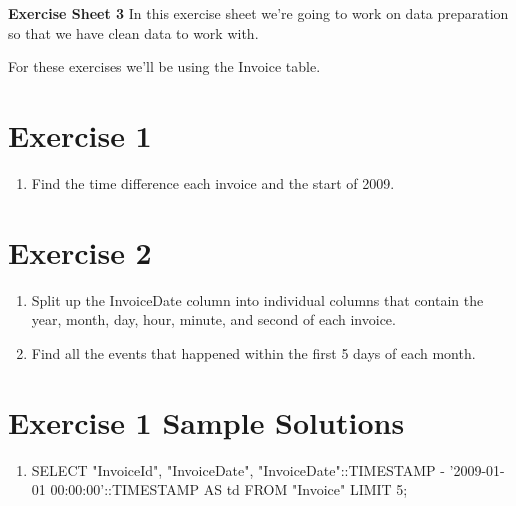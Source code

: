 \documentclass[USenglish,final,authoryear,12pt]{article}
\begin{document}
\textbf{\LARGE Exercise Sheet 3}\newline
In this exercise sheet we're going to work on data preparation so that we have clean data to work with.\newline

For these exercises we'll be using the Invoice table.
\section{Exercise 1}

\begin{enumerate}
	\item Find the time difference each invoice and the start of 2009.
\end{enumerate}

\section{Exercise 2}

\begin{enumerate}
	\item Split up the InvoiceDate column into individual columns that contain the year, month, day, hour, minute, and second of each invoice.
	\item Find all the events that happened within the first 5 days of each month.
\end{enumerate}

\pagebreak
\section{Exercise 1 Sample Solutions}
\begin{enumerate}
	\item SELECT "InvoiceId",\newline
	"InvoiceDate",\newline
	"InvoiceDate"::TIMESTAMP - '2009-01-01 00:00:00'::TIMESTAMP AS td\newline
	FROM "Invoice"\newline
	LIMIT 5;
\end{enumerate}
\end{document}
